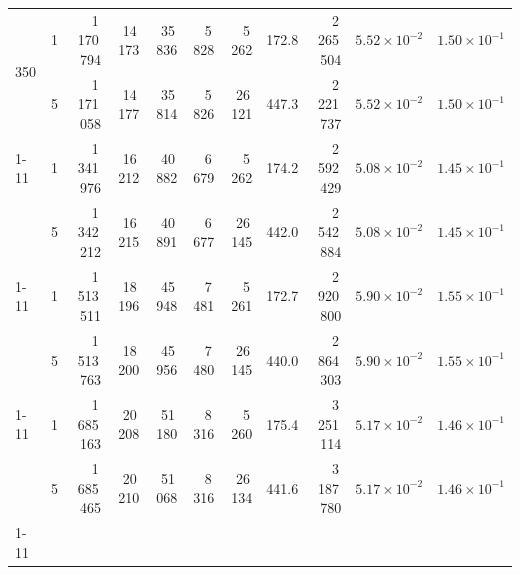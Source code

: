 \begin{tabular}{llrrrrrrrrr}
\multirow[t]{2}{*}{350} & 1 & 1\,170\,794 & 14\,173 & 35\,836 & 5\,828 & 5\,262 & 172.8 & 2\,265\,504 & $5.52\!\times\!10^{-2}$ & $1.50\!\times\!10^{-1}$ \\
 & 5 & 1\,171\,058 & 14\,177 & 35\,814 & 5\,826 & 26\,121 & 447.3 & 2\,221\,737 & $5.52\!\times\!10^{-2}$ & $1.50\!\times\!10^{-1}$ \\
\cline{1-11}
\multirow[t]{2}{*}{400} & 1 & 1\,341\,976 & 16\,212 & 40\,882 & 6\,679 & 5\,262 & 174.2 & 2\,592\,429 & $5.08\!\times\!10^{-2}$ & $1.45\!\times\!10^{-1}$ \\
 & 5 & 1\,342\,212 & 16\,215 & 40\,891 & 6\,677 & 26\,145 & 442.0 & 2\,542\,884 & $5.08\!\times\!10^{-2}$ & $1.45\!\times\!10^{-1}$ \\
\cline{1-11}
\multirow[t]{2}{*}{450} & 1 & 1\,513\,511 & 18\,196 & 45\,948 & 7\,481 & 5\,261 & 172.7 & 2\,920\,800 & $5.90\!\times\!10^{-2}$ & $1.55\!\times\!10^{-1}$ \\
 & 5 & 1\,513\,763 & 18\,200 & 45\,956 & 7\,480 & 26\,145 & 440.0 & 2\,864\,303 & $5.90\!\times\!10^{-2}$ & $1.55\!\times\!10^{-1}$ \\
\cline{1-11}
\multirow[t]{2}{*}{500} & 1 & 1\,685\,163 & 20\,208 & 51\,180 & 8\,316 & 5\,260 & 175.4 & 3\,251\,114 & $5.17\!\times\!10^{-2}$ & $1.46\!\times\!10^{-1}$ \\
 & 5 & 1\,685\,465 & 20\,210 & 51\,068 & 8\,316 & 26\,134 & 441.6 & 3\,187\,780 & $5.17\!\times\!10^{-2}$ & $1.46\!\times\!10^{-1}$ \\
\cline{1-11}
\bottomrule
\end{tabular}
